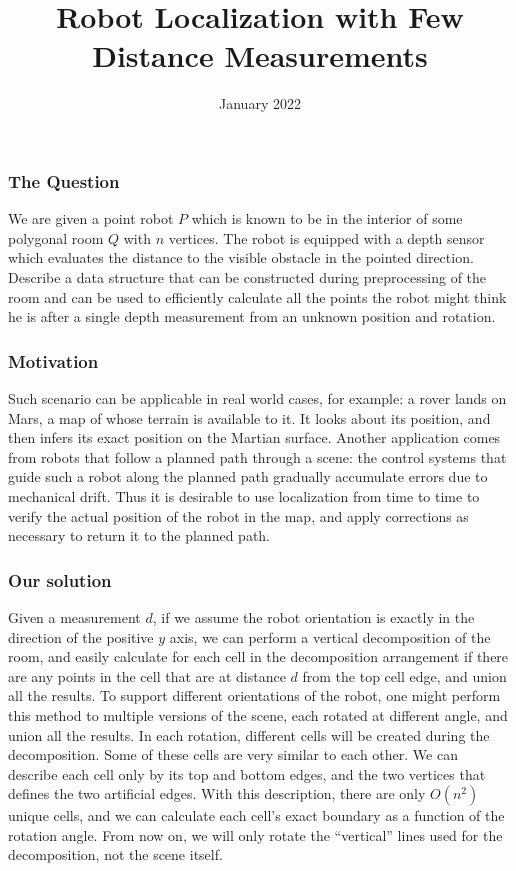 \documentclass[a4paper,12pt]{extarticle}
\title{Robot Localization with Few Distance Measurements}
\author{}
\date{January 2022}
\begin{document}
\maketitle

\subsubsection*{The Question}

We are given a point robot $P$ which is known to be in the interior
of some polygonal room $Q$ with $n$ vertices. The robot is equipped
with a depth sensor which evaluates the distance to the visible obstacle
in the pointed direction. Describe a data structure that can be constructed
during preprocessing of the room and can be used to efficiently calculate
all the points the robot might think he is after a single depth measurement
from an unknown position and rotation.

\subsubsection*{Motivation}

Such scenario can be applicable in real world cases, for example:
a rover lands on Mars, a map of whose terrain is available to it.
It looks about its position, and then infers its exact position on
the Martian surface. Another application comes from robots that follow
a planned path through a scene: the control systems that guide such
a robot along the planned path gradually accumulate errors due to
mechanical drift. Thus it is desirable to use localization from time
to time to verify the actual position of the robot in the map, and
apply corrections as necessary to return it to the planned path.

\newpage{}

\subsubsection*{Our solution}

Given a measurement $d$, if we assume the robot orientation is exactly in the direction of the positive $y$ axis, we can perform a vertical decomposition of the room, and easily calculate for each cell in the decomposition arrangement if there are any points in the cell that are at distance $d$ from the top cell edge, and union all the results. To support different orientations of the robot, one might perform this method to multiple versions of the scene, each rotated at different angle, and union all the results. In each rotation, different cells will be created during the decomposition. Some of these cells are very similar to each other. We can describe each cell only by its top and bottom edges, and the two vertices that defines the two artificial edges. With this description, there are only $O(n^{2})$ unique cells, and we can calculate each cell's exact boundary as a function of the rotation angle. From now on, we will only rotate the ``vertical'' lines used for the decomposition, not the scene itself.
\end{document}
